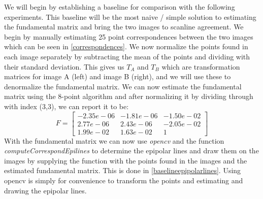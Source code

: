 We will begin by establishing a baseline for comparison with the following experiments. This baseline will be the most naive / simple solution to estimating the fundamental matrix and bring the two images to scanline agreement. We begin by manually estimating 25 point correspondences between the two images which can be seen in \autoref{correspondences}. We now normalize the points found in each image separately by subtracting the mean of the points and dividing with their standard deviation. This gives us $T_A$ and $T_B$ which are transformation matrices for image A (left) and image B (right), and we will use these to denormalize the fundamental matrix. We can now estimate the fundamental matrix using the 8-point algorithm and after normalizing it by dividing through with index (3,3), we can report it to be:
\begin{equation*}
	F = \begin{bmatrix}
		-2.35e-06 & -1.81e-06 & -1.50e-02\\
		2.77e-06 & 2.43e-06 & -2.05e-02\\
		1.99e-02 &1.63e-02 & 1
	\end{bmatrix}
\end{equation*}
With the fundamental matrix we can now use \textit{opencv} and the function \textit{computeCorrespondEpilines} to determine the epipolar lines and draw them on the images by supplying the function with the points found in the images and the estimated fundamental matrix. This is done in \autoref{baselineepipolarlines}. Using opencv is simply for convenience to transform the points and estimating and drawing the epipolar lines.

